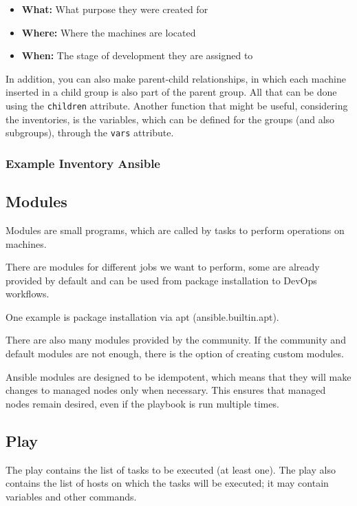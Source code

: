 \documentclass[12pt,a4paper,openright,twoside]{book}
\begin{document}
            \begin{itemize}
                \item \textbf{What:} What purpose they were created for
                \item \textbf{Where:} Where the machines are located
                \item \textbf{When:} The stage of development they are assigned to
            \end{itemize}
            
            In addition, you can also make parent-child relationships, in which each machine inserted in a child group is also part of the parent group. All that can be done using the \texttt{children} attribute.
            Another function that might be useful, considering the inventories, is the variables, which can be defined for the groups (and also subgroups), through the \texttt{vars} attribute.

\subsubsection{Example Inventory Ansible}



\subsection{Modules}
Modules are small programs, which are called by tasks to perform operations on machines.


There are modules for different jobs we want to perform, some are already provided by default and can be used from package installation to DevOps workflows.


One example is package installation via apt (ansible.builtin.apt).


There are also many modules provided by the community. If the community and default modules are not enough, there is the option of creating custom modules\cite{ansibleDocNewModules}.


Ansible modules are designed to be idempotent, which means that they will make changes to managed nodes only when necessary. This ensures that managed nodes remain desired, even if the playbook is run multiple times.

\subsection{Play}
The play contains the list of tasks to be executed (at least one). The play also contains the list of hosts on which the tasks will be executed; it may contain variables and other commands.
\end{document}
